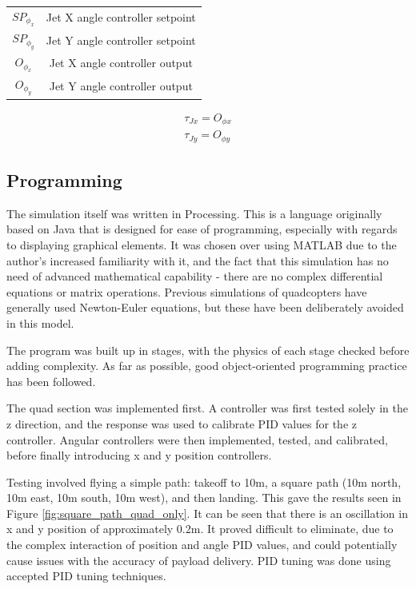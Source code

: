 \documentclass[11pt,twoside]{article}
\begin{document}
\begin{center}
\begin{tabular}{cc}
    $SP_{\phi_x}$ & Jet X angle controller setpoint \\
    $SP_{\phi_y}$ & Jet Y angle controller setpoint \\
    $O_{\phi_x}$ & Jet X angle controller output \\
    $O_{\phi_y}$ & Jet Y angle controller output \\
\end{tabular}

\begin{eqnarray}
    \tau_{Jx} = O_{\phi x} \\
    \tau_{Jy} = O_{\phi y}
\end{eqnarray}
\end{center}

\subsection{Programming}
The simulation itself was written in Processing. This is a language originally based on Java that is designed for ease of programming, especially with regards to displaying graphical elements\cite{processing}. It was chosen over using MATLAB due to the author's increased familiarity with it, and the fact that this simulation has no need of advanced mathematical capability - there are no complex differential equations or matrix operations. Previous simulations of quadcopters have generally used Newton-Euler equations\cite{quad_modelling_matlab}\cite{quad_modelling}\cite{quadcopter_dynamics}, but these have been deliberately avoided in this model.

The program was built up in stages, with the physics of each stage checked before adding complexity. As far as possible, good object-oriented programming practice has been followed.

The quad section was implemented first. A controller was first tested solely in the z direction, and the response was used to calibrate PID values for the z controller. Angular controllers were then implemented, tested, and calibrated, before finally introducing x and y position controllers.

Testing involved flying a simple path: takeoff to 10m, a square path (10m north, 10m east, 10m south, 10m west), and then landing. This gave the results seen in Figure \ref{fig:square_path_quad_only}. It can be seen that there is an oscillation in x and y position of approximately 0.2m. It proved difficult to eliminate, due to the complex interaction of position and angle PID values, and could potentially cause issues with the accuracy of payload delivery. PID tuning was done using accepted PID tuning techniques\cite{PID_tuning}.
\end{document}
